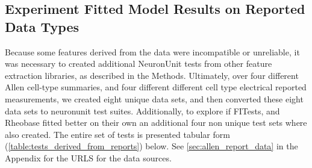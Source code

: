 




%






\subsection{Experiment Fitted Model Results on Reported Data Types} 
Because some features derived from the data were incompatible or unreliable, it was necessary to created additional NeuronUnit tests from other feature extraction libraries, as described in the Methods.
Ultimately, over four different Allen cell-type summaries, and four different different cell type  electrical reported measurements, we created eight unique data sets, and then converted these eight data sets to neuronunit test suites. Additionally, to explore if FITests, and Rheobase fitted better on their own an additional four non unique test sets where also created. The entire set of tests is presented tabular form (\ref{table:tests_derived_from_reports}) below. See \ref{sec:allen_report_data} in the Appendix for the URLS for the data sources.

